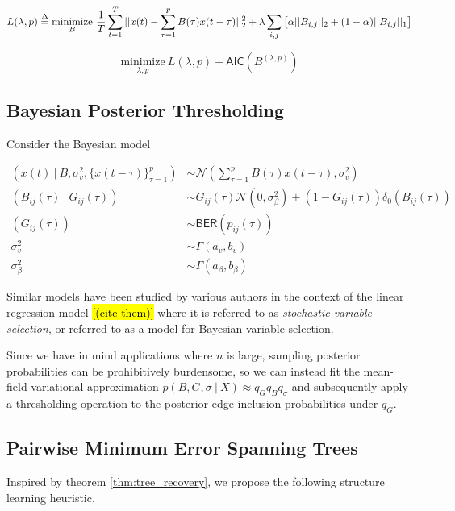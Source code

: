 \documentclass[12pt]{article}
\begin{document}
\begin{equation}
  L(\lambda, p) \overset{\Delta}{=} \underset{B}{\text{minimize}}\ \frac{1}{T}\sum_{t = 1}^T||x(t) - \sum_{\tau = 1}^pB(\tau)x(t - \tau)||_2^2 + \lambda \sum_{i, j}\big[\alpha||B_{i, j}||_2 + (1 - \alpha)||B_{i, j}||_1\big]
\end{equation}

\begin{equation}
  \underset{\lambda, p}{\text{minimize}}\ L(\lambda, p) + \mathsf{AIC}(B^{(\lambda, p)})
\end{equation}

\subsection{Bayesian Posterior Thresholding}
Consider the Bayesian model

\begin{equation}
  \begin{aligned}
    (x(t)\ |\ B, \sigma_v^2, \{x(t - \tau)\}_{\tau = 1}^p) &\sim \mathcal{N}(\sum_{\tau = 1}^pB(\tau)x(t - \tau), \sigma_v^2)\\
    (B_{ij}(\tau)\ |\ G_{ij}(\tau)) &\sim G_{ij}(\tau)\mathcal{N}(0, \sigma_\beta^2) + (1 - G_{ij}(\tau))\delta_0(B_{ij}(\tau))\\
    (G_{ij}(\tau)) &\sim \mathsf{BER}(p_{ij}(\tau))\\
    \sigma_v^2 &\sim \Gamma(a_v, b_v)\\
    \sigma_\beta^2 &\sim \Gamma(a_\beta, b_\beta)
  \end{aligned}
\end{equation}

Similar models have been studied by various authors in the context of the linear regression model \hl{[(cite them)]} where it is referred to as \textit{stochastic variable selection}, or referred to as a model for Bayesian variable selection.

Since we have in mind applications where $n$ is large, sampling posterior probabilities can be prohibitively burdensome, so we can instead fit the mean-field variational approximation $p(B, G, \sigma\ |\ X) \approx q_Gq_Bq_\sigma$ and subsequently apply a thresholding operation to the posterior edge inclusion probabilities under $q_G$.

\subsection{Pairwise Minimum Error Spanning Trees}
Inspired by theorem \ref{thm:tree_recovery}, we propose the following
structure learning heuristic.
\end{document}
